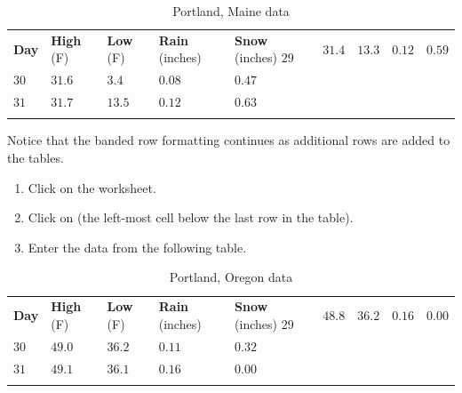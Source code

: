 \begin{table}[H]
	{\small
		\begin{longtable}{R{0.50in}R{0.50in}R{0.50in}R{0.50in}R{0.50in}} %
			\textbf{Day} & \textbf{High} (\textdegree F) & \textbf{Low} (\textdegree F) & \textbf{Rain} (inches) & \textbf{Snow} (inches) \endhead
			\hline
			$ 29 $ & $ 31.4 $ & $ 13.3 $ & $ 0.12 $ & $ 0.59 $ \\ 
			$ 30 $ & $ 31.6 $ & $ 3.4  $ & $ 0.08 $ & $ 0.47 $ \\ 
			$ 31 $ & $ 31.7 $ & $ 13.5 $ & $ 0.12 $ & $ 0.63 $ \\ 
			\caption{Portland, Maine data}
			\label{05:tab02}
		\end{longtable}
	} %
\end{table}

Notice that the banded row formatting continues as additional rows are added to the tables.

\begin{enumerate}
	\item Click on the  worksheet.
	\item Click on  (the left-most cell below the last row in the table).
	\item Enter the data from the following table.
\end{enumerate}

\begin{table}[H]
	{\small
		\begin{longtable}{R{0.50in}R{0.50in}R{0.50in}R{0.50in}R{0.50in}} %
			\textbf{Day} & \textbf{High} (\textdegree F) & \textbf{Low} (\textdegree F) & \textbf{Rain} (inches) & \textbf{Snow} (inches) \endhead
			\hline
			$ 29 $ & $ 48.8 $ & $ 36.2 $ & $ 0.16 $ & $ 0.00 $ \\ 
			$ 30 $ & $ 49.0 $ & $ 36.2 $ & $ 0.11 $ & $ 0.32 $ \\ 
			$ 31 $ & $ 49.1 $ & $ 36.1 $ & $ 0.16 $ & $ 0.00 $ \\ 
			\caption{Portland, Oregon data}
			\label{05:tab03}
		\end{longtable}
	} %
\end{table}

